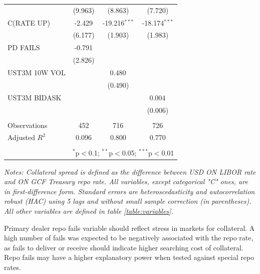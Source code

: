 \documentclass[11pt,a4paper,english,oneside]{article}
\begin{document}
\begin{appendices}
\begin{table}[!htbp]
\begin{tabular}{@{\extracolsep{5pt}}lccc}
  & (9.963) & (8.863) & (7.720) \\
 C(RATE UP) & -2.429$^{}$ & -19.216$^{***}$ & -18.174$^{***}$ \\
  & (6.177) & (1.903) & (1.983) \\
 PD FAILS & -0.791$^{}$ & & \\
  & (2.826) & & \\
 UST3M 10W VOL & & 0.480$^{}$ & \\
  & & (0.490) & \\
 UST3M BIDASK & & & 0.004$^{}$ \\
  & & & (0.006) \\
\hline \\[-1.8ex]
 Observations & 452 & 716 & 726 \\
 Adjusted $R^2$ & 0.096 & 0.800 & 0.770 \\
\hline
\hline \\[-1.8ex]
 & \multicolumn{3}{r}{$^{*}$p$<$0.1; $^{**}$p$<$0.05; $^{***}$p$<$0.01} \\
\end{tabular}
\begin{flushleft}
\vspace{-5pt}
  \textit{Notes: Collateral spread is defined as the difference between USD ON LIBOR rate and ON GCF Treasury repo rate. All variables, except categorical "C" ones, are in first-difference form. Standard errors are heteroscedasticity and autocorrelation robust (HAC) using 5 lags and without small sample correction (in parentheses). All other variables are defined in table \ref{table:variables}.}
\end{flushleft}
\end{table}

Primary dealer repo fails variable should reflect stress in markets for collateral. A high number of fails was expected to be negatively associated with the repo rate, as fails to deliver or receive should indicate higher searching cost of collateral. Repo fails may have a higher explanatory power when tested against special repo rates.

\end{appendices}

\newpage


%
\end{document}
